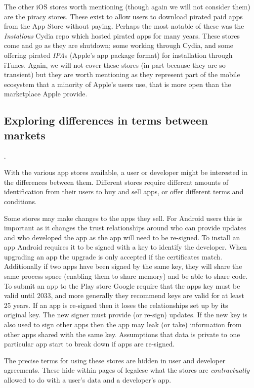 \documentclass[thesis.tex]{subfiles}
\begin{document}
The other iOS stores worth mentioning (though again we will not
consider them) are the piracy stores.  These exist to allow users to
download pirated paid apps from the App Store without paying.  Perhaps
the most notable of these was the \emph{Installous} Cydia repo which
hosted pirated apps for many years.  These stores come and go as they
are shutdown; some working through Cydia, and some offering pirated
\emph{IPA}s (Apple's app package format) for installation through
iTunes.  Again, we will not cover these stores (in part because they
are so transient) but they are worth mentioning as they represent part
of the mobile ecosystem that a minority of Apple's users use, that is
more open than the marketplace Apple provide.

\subsection{Exploring differences in terms between markets}.

With the various app stores available, a user or developer might be
interested in the differences between them.  Different stores require
different amounts of identification from their users to buy and sell
apps, or offer different terms and conditions.

Some stores may make changes to the apps they sell.  For Android users
this is important as it changes the trust relationships around who can
provide updates and who developed the app as the app will need to be
re-signed.  To install an app Android requires it to be signed with a
key to identify the developer.  When upgrading an app the upgrade is
only accepted if the certificates match.  Additionally if two apps
have been signed by the same key, they will share the same process
space (enabling them to share memory) and be able to share code. To
submit an app to the Play store Google require that the apps key must
be valid until 2033, and more generally they recommend keys are valid
for at least 25 years.  If an app is re-signed then it loses the
relationships set up by its original key. The new signer must provide
(or re-sign) updates.  If the new key is also used to sign other apps
then the app may leak (or take) information from other apps shared
with the same key.  Assumptions that data is private to one particular
app start to break down if apps are re-signed.

The precise terms for using these stores are hidden in user and
developer agreements.  These hide within pages of legalese what the
stores are \emph{contractually} allowed to do with a user's data and a
developer's app.
\end{document}
